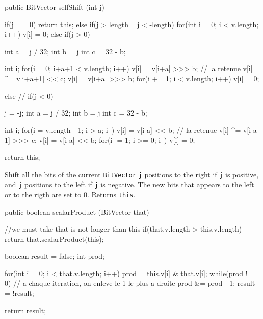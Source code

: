 \begin{code}

   public BitVector selfShift (int j) \begin{hide} {
      if(j == 0)
         return this;
      else if(j > length || j < -length) {
         for(int i = 0; i < v.length; i++)
            v[i] = 0;
      } else if(j > 0) {
         int a = j / 32;
         int b = j %
         int c = 32 - b;

         int i;
         for(i = 0; i+a+1 < v.length; i++) {
            v[i] = v[i+a] >>> b;
            // la retenue
            v[i] ^= v[i+a+1] << c;
         }
         v[i] = v[i+a] >>> b;
         for(i += 1; i < v.length; i++)
            v[i] = 0;
      } else // if(j < 0)
      {
         j = -j;
         int a = j / 32;
         int b = j %
         int c = 32 - b;

         int i;
         for(i = v.length - 1; i > a; i--) {
            v[i] = v[i-a] << b;
            // la retenue
            v[i] ^= v[i-a-1] >>> c;
         }
         v[i] = v[i-a] << b;
         for(i -= 1; i >= 0; i--)
            v[i] = 0;
      }

      return this;
   } \end{hide}
\end{code}
\begin{tabb} Shift all the bits of the current \texttt{BitVector} \texttt{j}
  positions to the right if \texttt{j} is positive, and  \texttt{j} positions 
  to the left if \texttt{j} is negative.
 The new bits that appears to the left or to the rigth are set to 0.
 Returns \texttt{this}.
\end{tabb}
\begin{htmlonly}
\end{htmlonly}
\begin{code}

   public boolean scalarProduct (BitVector that) \begin{hide} {
      //we must take that is not longer than this
      if(that.v.length > this.v.length)
         return that.scalarProduct(this);

      boolean result = false;
      int prod;

      for(int i = 0; i < that.v.length; i++) {
         prod = this.v[i] & that.v[i];
         while(prod != 0) {
            // a chaque iteration, on enleve le 1 le plus a droite
            prod &= prod - 1;
            result = !result;
         }
      }

      return result;
   } \end{hide}
\end{code}
